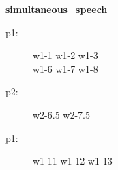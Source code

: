 \documentclass{article}
\newcommand{\turn}[2]{
\item[#1:] #2
}
\begin{document}
\begin{center}\textbf{simultaneous\_speech}\end{center}

\begin{description}

\turn{p1}{w1-1 w1-2 w1-3\\
w1-6 w1-7 w1-8}

\turn{p2}{w2-6.5 w2-7.5}

\turn{p1}{w1-11 w1-12 w1-13}


\end{description}
\end{document}
